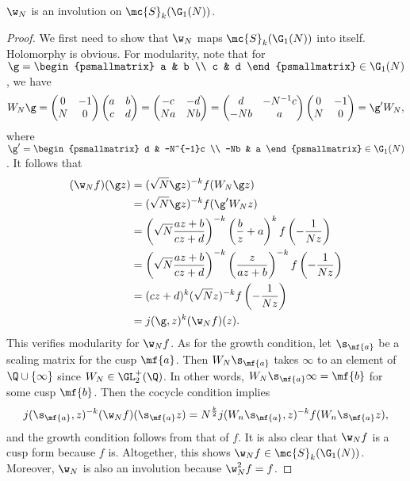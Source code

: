     \begin{proposition}\label{prop:Atkin_Lehner_holomorphic}
      $\w_{N}$ is an involution on $\mc{S}_{k}(\G_{1}(N))$.
    \end{proposition}
    \begin{proof}
      We first need to show that $\w_{N}$ maps $\mc{S}_{k}(\G_{1}(N))$ into itself. Holomorphy is obvious. For modularity, note that for $\g = \begin{psmallmatrix} a & b \\ c & d \end{psmallmatrix} \in \G_{1}(N)$, we have
      \[
        W_{N}\g = \begin{pmatrix} 0 & -1 \\ N & 0 \end{pmatrix}\begin{pmatrix} a & b \\ c & d \end{pmatrix} = \begin{pmatrix} -c & -d \\ Na & Nb \\ \end{pmatrix} = \begin{pmatrix} d & -N^{-1}c \\ -Nb & a \end{pmatrix}\begin{pmatrix} 0 & -1 \\ N & 0 \end{pmatrix} = \g'W_{N},
      \]
      where $\g' = \begin{psmallmatrix} d & -N^{-1}c \\ -Nb & a \end{psmallmatrix} \in \G_{1}(N)$. It follows that
      \begin{align*}
        (\w_{N}f)(\g z) &= (\sqrt{N}\g z)^{-k}f(W_{N}\g z) \\
        &= (\sqrt{N}\g z)^{-k}f(\g'W_{N}z) \\
        &= \left(\sqrt{N}\frac{az+b}{cz+d}\right)^{-k}\left(\frac{b}{z}+a\right)^{k}f\left(-\frac{1}{Nz}\right) \\
        &= \left(\sqrt{N}\frac{az+b}{cz+d}\right)^{-k}\left(\frac{z}{az+b}\right)^{-k}f\left(-\frac{1}{Nz}\right) \\
        &= (cz+d)^{k}(\sqrt{N}z)^{-k}f\left(-\frac{1}{Nz}\right) \\
        &= j(\g,z)^{k}(\w_{N}f)(z).
      \end{align*}
      This verifies modularity for $\w_{N}f$. As for the growth condition, let $\s_{\mf{a}}$ be a scaling matrix for the cusp $\mf{a}$. Then $W_{N}\s_{\mf{a}}$ takes $\infty$ to an element of $\Q \cup \{\infty\}$ since $W_{N} \in \GL_{2}^{+}(\Q)$. In other words, $W_{N}\s_{\mf{a}}\infty = \mf{b}$ for some cusp $\mf{b}$. Then the cocycle condition implies
      \[
        j(\s_{\mf{a}},z)^{-k}(\w_{N}f)(\s_{\mf{a}}z) = N^{\frac{k}{2}}j(W_{n}\s_{\mf{a}},z)^{-k}f(W_{n}\s_{\mf{a}}z),
      \]
      and the growth condition follows from that of $f$. It is also clear that $\w_{N}f$ is a cusp form because $f$ is. Altogether, this shows $\w_{N}f \in \mc{S}_{k}(\G_{1}(N))$. Moreover, $\w_{N}$ is also an involution because $\w_{N}^{2}f = f$. 
    \end{proof}

